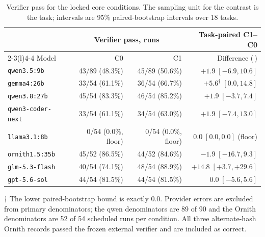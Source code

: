 \documentclass[10pt]{article}
\newcommand{\pp}{\,\text{pp}}
\newcommand{\QwenWeak}{\texttt{qwen3.5:\allowbreak 9b}}
\newcommand{\Gemma}{\texttt{gemma4:\allowbreak 26b}}
\newcommand{\QwenStrong}{\texttt{qwen3.8:\allowbreak 27b}}
\newcommand{\Coder}{\texttt{qwen3-coder-next}}
\newcommand{\Llama}{\texttt{llama3.1:\allowbreak 8b}}
\newcommand{\Ornith}{\texttt{ornith1.5:\allowbreak 35b}}
\newcommand{\GLM}{\texttt{glm-5.3-flash}}
\newcommand{\GPT}{\texttt{gpt-5.6-sol}}
\begin{document}
\begin{table}[t]
\centering
\scriptsize
\begin{threeparttable}
\caption{Verifier pass for the locked core conditions. The sampling unit for the contrast is the task; intervals are 95\% paired-bootstrap intervals over 18 tasks.}
\label{tab:core}
\begin{tabular}{@{}lrrr@{}}
\toprule
& \multicolumn{2}{c}{Verifier pass, runs} & Task-paired C1--C0 \\
\cmidrule(lr){2-3}\cmidrule(l){4-4}
Model & C0 & C1 & Difference (\pp) \\
\midrule
\QwenWeak & 43/89 (48.3\%) & 45/89 (50.6\%) & \(+1.9\;[-6.9,10.6]\) \\
\Gemma & 33/54 (61.1\%) & 36/54 (66.7\%) & \(+5.6^\dagger\;[0.0,14.8]\) \\
\QwenStrong & 45/54 (83.3\%) & 46/54 (85.2\%) & \(+1.9\;[-3.7,7.4]\) \\
\Coder & 33/54 (61.1\%) & 34/54 (63.0\%) & \(+1.9\;[-7.4,13.0]\) \\
\Llama & 0/54 (0.0\%, floor) & 0/54 (0.0\%, floor) & \(0.0\;[0.0,0.0]\) (floor) \\
\Ornith & 45/52 (86.5\%) & 44/52 (84.6\%) & \(-1.9\;[-16.7,9.3]\) \\
\GLM & 40/54 (74.1\%) & 48/54 (88.9\%) & \(+14.8\;[+3.7,+29.6]\) \\
\GPT\tnote{a} & 44/54 (81.5\%) & 44/54 (81.5\%) & \(0.0\;[-5.6,5.6]\) \\
\bottomrule
\end{tabular}
\begin{tablenotes}[flushleft]\footnotesize
\item[] \(\dagger\) The lower paired-bootstrap bound is exactly 0.0. Provider errors are excluded from primary denominators; the qwen denominators are 89 of 90 and the Ornith denominators are 52 of 54 scheduled runs per condition. All three alternate-hash Ornith records passed the frozen external verifier and are included as correct.
\end{tablenotes}
\end{threeparttable}
\end{table}
\end{document}
